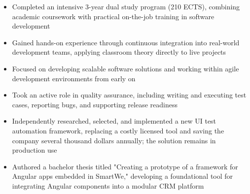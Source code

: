 \documentclass[10pt, a4paper]{cvhari}
\begin{document}
    \vspace{0.2em}
    \begin{itemize}
        \item Completed an intensive 3-year dual study program (210 ECTS), combining academic coursework with practical on-the-job training in software development

        \item Gained hands-on experience through continuous integration into real-world development teams, applying classroom theory directly to live projects

        \item Focused on developing scalable software solutions and working within agile development environments from early on

        \item Took an active role in quality assurance, including writing and executing test cases, reporting bugs, and supporting release readiness

        \item Independently researched, selected, and implemented a new UI test automation framework, replacing a costly licensed tool and saving the company several thousand dollars annually; the solution remains in production use

        \item Authored a bachelor thesis titled "Creating a prototype of a framework for Angular apps embedded in SmartWe," developing a foundational tool for integrating Angular components into a modular CRM platform
    \end{itemize}
\medskip
\end{document}
